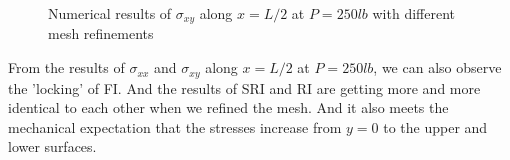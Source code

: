 \documentclass{article}
\begin{document}
\begin{figure}[H]
    \centering
    \qquad
    \qquad
    \caption{Numerical results of $\sigma_{xy}$ along $x = L/2$ at $P = 250 lb$ with different mesh refinements}
\end{figure}

From the results of $\sigma_{xx}$ and $\sigma_{xy}$ along $x = L/2$ at $P = 250 lb$, we can also observe the 'locking' of FI. And the results of SRI and RI are getting more and more identical to each other when we refined the mesh. And it also meets the mechanical expectation that the stresses increase from $y = 0$ to the upper and lower surfaces.
\end{document}
